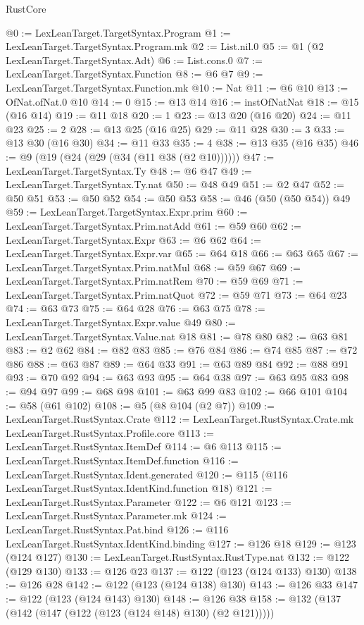 \begin{lexlean}{RustCore}
\begin{coremodule}
@0 := LexLeanTarget.TargetSyntax.Program
@1 := LexLeanTarget.TargetSyntax.Program.mk
@2 := List.nil.{0}
@5 := @1 (@2 LexLeanTarget.TargetSyntax.Adt)
@6 := List.cons.{0}
@7 := LexLeanTarget.TargetSyntax.Function
@8 := @6 @7
@9 := LexLeanTarget.TargetSyntax.Function.mk
@10 := Nat
@11 := @6 @10
@13 := OfNat.ofNat.{0} @10
@14 := 0
@15 := @13 @14
@16 := instOfNatNat
@18 := @15 (@16 @14)
@19 := @11 @18
@20 := 1
@23 := @13 @20 (@16 @20)
@24 := @11 @23
@25 := 2
@28 := @13 @25 (@16 @25)
@29 := @11 @28
@30 := 3
@33 := @13 @30 (@16 @30)
@34 := @11 @33
@35 := 4
@38 := @13 @35 (@16 @35)
@46 := @9 (@19 (@24 (@29 (@34 (@11 @38 (@2 @10))))))
@47 := LexLeanTarget.TargetSyntax.Ty
@48 := @6 @47
@49 := LexLeanTarget.TargetSyntax.Ty.nat
@50 := @48 @49
@51 := @2 @47
@52 := @50 @51
@53 := @50 @52
@54 := @50 @53
@58 := @46 (@50 (@50 @54)) @49
@59 := LexLeanTarget.TargetSyntax.Expr.prim
@60 := LexLeanTarget.TargetSyntax.Prim.natAdd
@61 := @59 @60
@62 := LexLeanTarget.TargetSyntax.Expr
@63 := @6 @62
@64 := LexLeanTarget.TargetSyntax.Expr.var
@65 := @64 @18
@66 := @63 @65
@67 := LexLeanTarget.TargetSyntax.Prim.natMul
@68 := @59 @67
@69 := LexLeanTarget.TargetSyntax.Prim.natRem
@70 := @59 @69
@71 := LexLeanTarget.TargetSyntax.Prim.natQuot
@72 := @59 @71
@73 := @64 @23
@74 := @63 @73
@75 := @64 @28
@76 := @63 @75
@78 := LexLeanTarget.TargetSyntax.Expr.value @49
@80 := LexLeanTarget.TargetSyntax.Value.nat @18
@81 := @78 @80
@82 := @63 @81
@83 := @2 @62
@84 := @82 @83
@85 := @76 @84
@86 := @74 @85
@87 := @72 @86
@88 := @63 @87
@89 := @64 @33
@91 := @63 @89 @84
@92 := @88 @91
@93 := @70 @92
@94 := @63 @93
@95 := @64 @38
@97 := @63 @95 @83
@98 := @94 @97
@99 := @68 @98
@101 := @63 @99 @83
@102 := @66 @101
@104 := @58 (@61 @102)
@108 := @5 (@8 @104 (@2 @7))
@109 := LexLeanTarget.RustSyntax.Crate
@112 := LexLeanTarget.RustSyntax.Crate.mk LexLeanTarget.RustSyntax.Profile.core
@113 := LexLeanTarget.RustSyntax.ItemDef
@114 := @6 @113
@115 := LexLeanTarget.RustSyntax.ItemDef.function
@116 := LexLeanTarget.RustSyntax.Ident.generated
@120 := @115 (@116 LexLeanTarget.RustSyntax.IdentKind.function @18)
@121 := LexLeanTarget.RustSyntax.Parameter
@122 := @6 @121
@123 := LexLeanTarget.RustSyntax.Parameter.mk
@124 := LexLeanTarget.RustSyntax.Pat.bind
@126 := @116 LexLeanTarget.RustSyntax.IdentKind.binding
@127 := @126 @18
@129 := @123 (@124 @127)
@130 := LexLeanTarget.RustSyntax.RustType.nat
@132 := @122 (@129 @130)
@133 := @126 @23
@137 := @122 (@123 (@124 @133) @130)
@138 := @126 @28
@142 := @122 (@123 (@124 @138) @130)
@143 := @126 @33
@147 := @122 (@123 (@124 @143) @130)
@148 := @126 @38
@158 := @132 (@137 (@142 (@147 (@122 (@123 (@124 @148) @130) (@2 @121)))))

\end{coremodule}
\end{lexlean}
